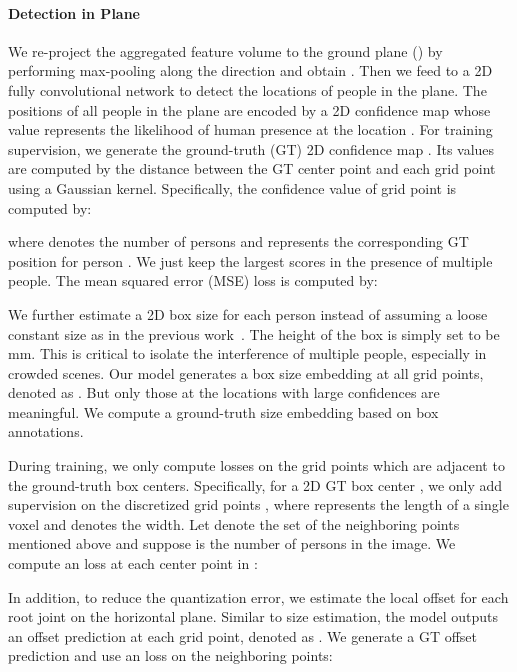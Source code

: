 \paragraph{Detection in  Plane}
We re-project the aggregated feature volume to the ground plane () by performing max-pooling along the  direction and obtain . Then we feed  to a 2D fully convolutional network to detect the locations of people in the  plane. The positions of all people in the plane are encoded by a 2D confidence map  whose value  represents the likelihood of human presence at the location . For training supervision, we generate the ground-truth (GT) 2D confidence map . Its values are computed by the distance between the GT center point and each grid point using a Gaussian kernel. Specifically, the confidence value of grid point  is computed by:

where  denotes the number of persons and  represents the corresponding GT position for person . We just keep the largest scores in the presence of multiple people. The mean squared error (MSE) loss is computed by:



We further estimate a 2D box size for each person instead of assuming a loose constant size as in the previous work~\cite{voxelpose}. The height of the box is simply set to be mm. This is critical to isolate the interference of multiple people, especially in crowded scenes. Our model generates a box size embedding at all grid points, denoted as . But only those at the locations with large confidences are meaningful. We compute a ground-truth size embedding  based on box annotations. 






During training, we only compute losses on the grid points which are adjacent to the ground-truth box centers. Specifically, for a 2D GT box center , we only add supervision on the discretized grid points , where  represents the length of a single voxel and  denotes the width. Let  denote the set of the neighboring points mentioned above and suppose  is the number of persons in the image. We compute an  loss at each center point in :


In addition, to reduce the quantization error, we estimate the local offset for each root joint on the horizontal plane. Similar to size estimation, the model outputs an offset prediction at each grid point, denoted as . We generate a GT offset prediction  and use an  loss on the neighboring points:


